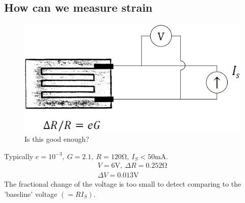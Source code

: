 \documentclass[class=report, crop=false, 12pt,a4paper]{standalone}
\begin{document}
\subsection{How can we measure strain}
\begin{figure}[H]
  \centering
  \includegraphics[width = 0.8 \textwidth]{../img/diagram11.png}
  \caption{Is this good enough?}
\end{figure}
Typically $e = 10^{-3}, \ G = 2.1, \ R = 120 \si{\ohm}, \ I_S < 50 \si{\milli \ampere}$.
\begin{gather}
  V = 6 \si{\volt}, \ \Delta R = 0.252 \si{\ohm}\\
  \Delta V = 0.013 \si{\volt}
\end{gather}
The fractional change of the voltage is too small to detect comparing to the 'baseline' voltage $(=RI_S)$.
\end{document}

